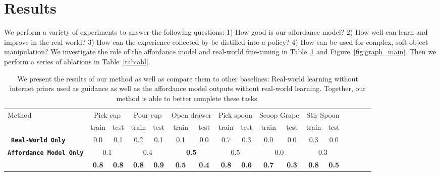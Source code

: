 \section{Results}
\label{sec:results}

We perform a variety of experiments to answer the following questions:  1) How good is our affordance model? 2) How well can \ours learn and improve in the real world? 3) How can the experience collected by \ours be distilled into a policy? 4) How can \ours be used for complex, soft object manipulation? We investigate the role of the affordance model and real-world fine-tuning in Table~\ref{tab:main} and Figure~\ref{fig:graph_main}. Then we perform a series of ablations in Table~\ref{tab:abl}.

\begin{table}[H]
    \centering
    \resizebox{\linewidth}{!}
    {%
        \begin{tabular}{lcccccccccccccccc}
        \toprule
        Method & \multicolumn{2}{c}{Pick cup} & \multicolumn{2}{c}{Pour cup} & \multicolumn{2}{c}{Open drawer} & \multicolumn{2}{c}{Pick spoon} & \multicolumn{2}{c}{Scoop Grape} & \multicolumn{2}{c}{Stir Spoon} & \\ 
        & train & test & train & test & train & test & train & test & train & test & train & test \\
        \midrule
        \
        \textbf{\texttt{Real-World Only}} & 0.0 & 0.1 & 0.2 & 0.1 & 0.1 & 0.0 & 0.7 & 0.3 & 0.0 & 0.0 & 0.3 & 0.0 \\ 
        \textbf{\texttt{Affordance Model Only}} & \multicolumn{2}{c}{0.1} & \multicolumn{2}{c}{0.4} & \multicolumn{2}{c}{\textbf{0.5}} & \multicolumn{2}{c}{0.5} & \multicolumn{2}{c}{0.0} & \multicolumn{2}{c}{0.3}\\ 
        
        \midrule
        \textbf{\texttt{\ours}} & \textbf{0.8} & \textbf{0.8} & \textbf{0.8} & \textbf{0.9} & \textbf{0.5} & \textbf{0.4} & \textbf{0.8} & \textbf{0.6} & \textbf{0.7} & \textbf{0.3} & \textbf{0.8} & \textbf{0.5}\\
        \bottomrule
        \end{tabular}
    }
    \vspace{0.05in}
    \caption{We present the results of our method as well as compare them to other baselines: Real-world learning without internet priors used as guidance as well as the affordance model outputs without real-world learning.  Together, our method is able to better complete these tasks.}
    \label{tab:main}
\end{table}




